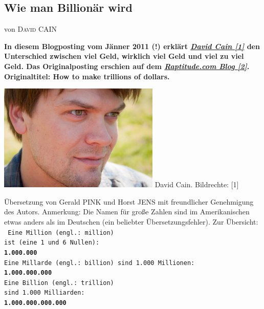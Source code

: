 \documentclass[10pt,a4paper,ngerman,twoside]{article} %
\newcommand{\NewsItem}[1]{ %
\usefont{T1}{fvs}{n}{n} %
\vspace{24pt}\large #1\vspace{3pt} %
\par \normalsize \normalfont}
\newcommand{\NewsAuthor}[1]{ %
\hfill von \textsc{#1} \vspace{20pt} %
\par \normalfont}
\begin{document}
\begin{multicols}{3}
\NewsItem{}
\section*{Wie man Billion\"ar wird}
\label{trillions}
\NewsAuthor{David CAIN}

\textbf{In diesem Blogposting vom Jänner 2011 (!) erklärt \href{http://www.raptitude.com/contact/}{\textit{David Cain [1]}} den Unterschied zwischen viel Geld, wirklich viel Geld und viel zu viel Geld. Das Originalposting erschien auf dem \href{http://www.raptitude.com/2011/01/how-to-make-trillions-of-dollars}{\textit{Raptitude.com Blog [2]}}. Originaltitel: How to make trillions of dollars.}

\begin{center}
\includegraphics[width=0.9\linewidth]{trillions/trillions-davidcain.jpg} 
\footnotesize{David Cain. Bildrechte: [1]}
\end{center}

Übersetzung von Gerald PINK und Horst JENS mit freundlicher Genehmigung des Autors. Anmerkung: Die Namen für große Zahlen sind im Amerikanischen etwas anders als im Deutschen (ein beliebter Übersetzungsfehler). Zur Übersicht: \\
\texttt{
Eine Million  (engl.: million)\\
ist (eine 1 und 6 Nullen):\\
\textbf{1.000.000}\\
Eine Millarde (engl.: billion)
sind 1.000 Millionen:\\
\textbf{1.000.000.000}\\
Eine Billion  (engl.: trillion) \\
sind 1.000 Milliarden: \\
\textbf{1.000.000.000.000}
}


\end{multicols}
\end{document}
